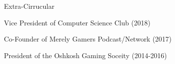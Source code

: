 \documentclass{resume} %
\begin{document}

\begin{rSection}{Extra-Cirrucular} \itemsep -3pt
    
    \item Vice President of Computer Science Club (2018)
    \item Co-Founder of Merely Gamers Podcast/Network (2017)
    \item President of the Oshkosh Gaming Soceity (2014-2016)

\end{rSection}
\end{document}
